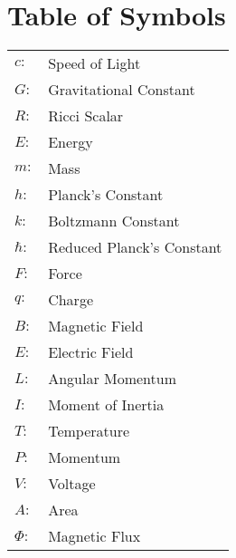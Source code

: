 \chapter*{Table of Symbols}
\begin{tabular}{ll} %
    $c:$ & Speed of Light \\
    $G:$ & Gravitational Constant \\
    $R:$ & Ricci Scalar \\
    $E:$ & Energy \\
    $m:$ & Mass \\
    $h:$ & Planck's Constant \\
    $k:$ & Boltzmann Constant \\
    $\hbar:$ & Reduced Planck's Constant \\
    $F:$ & Force \\
    $q:$ & Charge \\
    $B:$ & Magnetic Field \\
    $E:$ & Electric Field \\
    $L:$ & Angular Momentum \\
    $I:$ & Moment of Inertia \\
    $T:$ & Temperature \\
    $P:$ & Momentum \\
    $V:$ & Voltage \\
    $A:$ & Area \\
    $\Phi:$ & Magnetic Flux \\
\end{tabular}